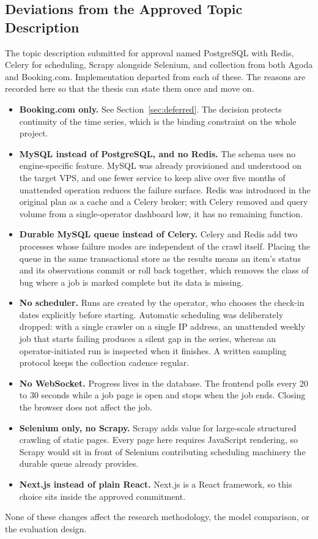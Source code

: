 \subsection{Deviations from the Approved Topic Description}
\label{sec:deviations}

The topic description submitted for approval named PostgreSQL with Redis, Celery for scheduling, Scrapy alongside Selenium, and collection from both Agoda and Booking.com. Implementation departed from each of these. The reasons are recorded here so that the thesis can state them once and move on.

\begin{itemize}[leftmargin=*]
    \item \textbf{Booking.com only.} See Section~\ref{sec:deferred}. The decision protects continuity of the time series, which is the binding constraint on the whole project.

    \item \textbf{MySQL instead of PostgreSQL, and no Redis.} The schema uses no engine-specific feature. MySQL was already provisioned and understood on the target VPS, and one fewer service to keep alive over five months of unattended operation reduces the failure surface. Redis was introduced in the original plan as a cache and a Celery broker; with Celery removed and query volume from a single-operator dashboard low, it has no remaining function.

    \item \textbf{Durable MySQL queue instead of Celery.} Celery and Redis add two processes whose failure modes are independent of the crawl itself. Placing the queue in the same transactional store as the results means an item's status and its observations commit or roll back together, which removes the class of bug where a job is marked complete but its data is missing.

    \item \textbf{No scheduler.} Runs are created by the operator, who chooses the check-in dates explicitly before starting. Automatic scheduling was deliberately dropped: with a single crawler on a single IP address, an unattended weekly job that starts failing produces a silent gap in the series, whereas an operator-initiated run is inspected when it finishes. A written sampling protocol keeps the collection cadence regular.

    \item \textbf{No WebSocket.} Progress lives in the database. The frontend polls every 20 to 30 seconds while a job page is open and stops when the job ends. Closing the browser does not affect the job.

    \item \textbf{Selenium only, no Scrapy.} Scrapy adds value for large-scale structured crawling of static pages. Every page here requires JavaScript rendering, so Scrapy would sit in front of Selenium contributing scheduling machinery the durable queue already provides.

    \item \textbf{Next.js instead of plain React.} Next.js is a React framework, so this choice sits inside the approved commitment.
\end{itemize}

None of these changes affect the research methodology, the model comparison, or the evaluation design.
